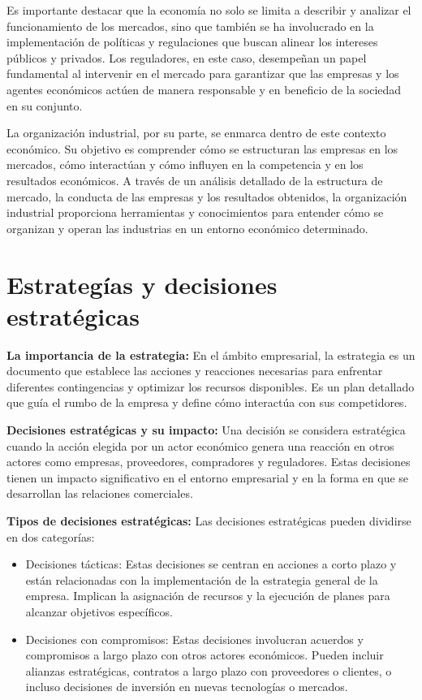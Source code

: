 \documentclass[
  doc,
  floatsintext,
  longtable,
  a4paper,
  nolmodern,
  notxfonts,
  notimes,
  12pt,
  colorlinks=true,linkcolor=blue,citecolor=blue,urlcolor=blue]{apa7}
\begin{document}
Es importante destacar que la economía no solo se limita a describir y
analizar el funcionamiento de los mercados, sino que también se ha
involucrado en la implementación de políticas y regulaciones que buscan
alinear los intereses públicos y privados. Los reguladores, en este
caso, desempeñan un papel fundamental al intervenir en el mercado para
garantizar que las empresas y los agentes económicos actúen de manera
responsable y en beneficio de la sociedad en su conjunto.

La organización industrial, por su parte, se enmarca dentro de este
contexto económico. Su objetivo es comprender cómo se estructuran las
empresas en los mercados, cómo interactúan y cómo influyen en la
competencia y en los resultados económicos. A través de un análisis
detallado de la estructura de mercado, la conducta de las empresas y los
resultados obtenidos, la organización industrial proporciona
herramientas y conocimientos para entender cómo se organizan y operan
las industrias en un entorno económico determinado.

\section{Estrategías y decisiones
estratégicas}\label{estrateguxedas-y-decisiones-estratuxe9gicas}

\textbf{La importancia de la estrategia:} En el ámbito empresarial, la
estrategia es un documento que establece las acciones y reacciones
necesarias para enfrentar diferentes contingencias y optimizar los
recursos disponibles. Es un plan detallado que guía el rumbo de la
empresa y define cómo interactúa con sus competidores.

\textbf{Decisiones estratégicas y su impacto:} Una decisión se considera
estratégica cuando la acción elegida por un actor económico genera una
reacción en otros actores como empresas, proveedores, compradores y
reguladores. Estas decisiones tienen un impacto significativo en el
entorno empresarial y en la forma en que se desarrollan las relaciones
comerciales.

\textbf{Tipos de decisiones estratégicas:} Las decisiones estratégicas
pueden dividirse en dos categorías:

\begin{itemize}
\item
  Decisiones tácticas: Estas decisiones se centran en acciones a corto
  plazo y están relacionadas con la implementación de la estrategia
  general de la empresa. Implican la asignación de recursos y la
  ejecución de planes para alcanzar objetivos específicos.
\item
  Decisiones con compromisos: Estas decisiones involucran acuerdos y
  compromisos a largo plazo con otros actores económicos. Pueden incluir
  alianzas estratégicas, contratos a largo plazo con proveedores o
  clientes, o incluso decisiones de inversión en nuevas tecnologías o
  mercados.
\end{itemize}
\end{document}
